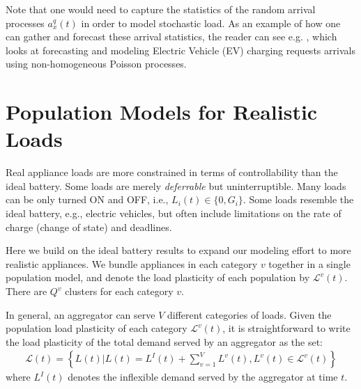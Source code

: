 \documentclass[10pt]{IEEEtran}
\begin{document}
Note that one would need to capture the statistics of the random arrival processes $a^q_x(t)$ in order to model stochastic load.  As an example of how one can gather and forecast these arrival statistics, the reader can see e.g. \cite{alizadeh2013ev}, which looks at forecasting and modeling Electric Vehicle (EV) charging requests arrivals using non-homogeneous Poisson processes.  


\vspace{-0.1cm}

\section{Population Models for Realistic Loads}\label{pop.gen}
Real appliance loads are more constrained in terms of controllability than the ideal battery. Some loads are merely {\it deferrable} but uninterruptible. Many loads can be only turned ON and OFF, i.e., $L_i(t)\in\{0,G_i\}$. Some loads resemble the ideal battery, e.g., electric vehicles, but often include limitations on the rate of charge (change of state) and deadlines.

Here we build on the ideal battery results to expand our modeling effort to more realistic appliances. We bundle appliances in each category $v$ together in a single population model, and denote the load plasticity of each population by $\mathcal{L}^v(t)$. There are $Q^v$ clusters for each category $v$.

In general, an aggregator can serve $V$ different categories of loads. Given the population load plasticity of each category ${\mathcal L}^v(t)$, it is straightforward to write the load plasticity of the total demand served by an aggregator as the set:
\begin{align}\label{totplas}
{\mathcal L}(t)=\left\{L(t)|  L(t) = L^{I}(t) + \sum_{v=1}^V L^v(t), L^v(t) \in {\mathcal L}^v(t) \right\}
\end{align}
where $L^{I}(t)$ denotes the inflexible demand served by the aggregator at time $t$.
\end{document}
